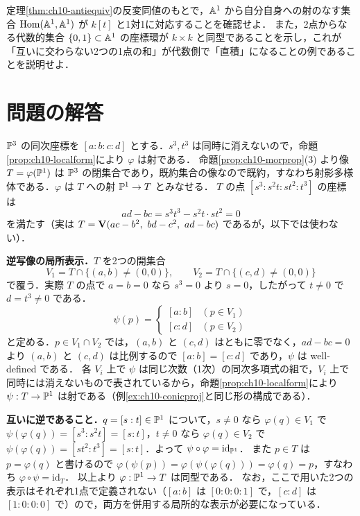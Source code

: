 定理\ref{thm:ch10-antiequiv}の反変同値のもとで，$\mathbb{A}^1$ から自分自身への射のなす集合 $\operatorname{Hom}(\mathbb{A}^1,\mathbb{A}^1)$ が $k[t]$ と1対1に対応することを確認せよ．
また，2点からなる代数的集合 $\{0,1\}\subset\mathbb{A}^1$ の座標環が $k\times k$ と同型であることを示し，これが「互いに交わらない2つの1点の和」が代数側で「直積」になることの例であることを説明せよ．

\section*{問題の解答}

$\mathbb{P}^3$ の同次座標を $[a:b:c:d]$ とする．$s^3,t^3$ は同時に消えないので，命題\ref{prop:ch10-localform}により $\varphi$ は射である．
命題\ref{prop:ch10-morprop}(3) より像 $T=\varphi(\mathbb{P}^1)$ は $\mathbb{P}^3$ の閉集合であり，既約集合の像なので既約，すなわち射影多様体である．$\varphi$ は $T$ への射 $\mathbb{P}^1\to T$ とみなせる．
$T$ の点 $[s^3:s^2t:st^2:t^3]$ の座標は
\[
  ad-bc=s^3t^3-s^2t\cdot st^2=0
\]
を満たす（実は $T=\Zero(ac-b^2,\ bd-c^2,\ ad-bc)$ であるが，以下では使わない）．

\textbf{逆写像の局所表示．}$T$ を2つの開集合
\[
  V_1=T\cap\{(a,b)\neq(0,0)\},\qquad V_2=T\cap\{(c,d)\neq(0,0)\}
\]
で覆う．実際 $T$ の点で $a=b=0$ なら $s^3=0$ より $s=0$，したがって $t\neq0$ で $d=t^3\neq0$ である．
\[
  \psi(p)=\begin{cases}[a:b] & (p\in V_1)\\ [c:d] & (p\in V_2)\end{cases}
\]
と定める．$p\in V_1\cap V_2$ では，$(a,b)$ と $(c,d)$ はともに零でなく，$ad-bc=0$ より $(a,b)$ と $(c,d)$ は比例するので $[a:b]=[c:d]$ であり，$\psi$ は well-defined である．
各 $V_i$ 上で $\psi$ は同じ次数（1次）の同次多項式の組で，$V_i$ 上で同時には消えないもので表されているから，命題\ref{prop:ch10-localform}により $\psi:T\to\mathbb{P}^1$ は射である（例\ref{ex:ch10-conicproj}と同じ形の構成である）．

\textbf{互いに逆であること．}$q=[s:t]\in\mathbb{P}^1$ について，$s\neq0$ なら $\varphi(q)\in V_1$ で $\psi(\varphi(q))=[s^3:s^2t]=[s:t]$，$t\neq0$ なら $\varphi(q)\in V_2$ で $\psi(\varphi(q))=[st^2:t^3]=[s:t]$．よって $\psi\circ\varphi=\mathrm{id}_{\mathbb{P}^1}$．
また $p\in T$ は $p=\varphi(q)$ と書けるので $\varphi(\psi(p))=\varphi(\psi(\varphi(q)))=\varphi(q)=p$，すなわち $\varphi\circ\psi=\mathrm{id}_T$．
以上より $\varphi:\mathbb{P}^1\to T$ は同型である．
なお，ここで用いた2つの表示はそれぞれ1点で定義されない（$[a:b]$ は $[0:0:0:1]$ で，$[c:d]$ は $[1:0:0:0]$ で）ので，両方を併用する局所的な表示が必要になっている．

